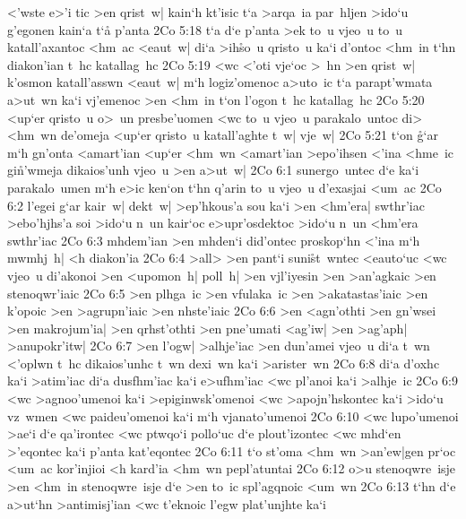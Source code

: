 <'wste
e>'i
tic
>en
qrist~w|
kain`h
kt'isic
t`a
>arqa~ia
par~hljen
>ido`u
g'egonen
kain`a
t`a\r{}
p'anta\bibvsend
\vs 2Co 5:18
t`a
d`e
p'anta
>ek
to~u
vjeo~u
to~u
katall'axantoc
<hm~ac
<eaut~w|
di`a
>ih\r{s}o~u
qristo~u
ka`i
d'ontoc
<hm~in
t`hn
diakon'ian
t~hc
katallag~hc\bibvsend
\vs 2Co 5:19
<wc
<'oti
vje`oc
>~hn
>en
qrist~w|
k'osmon
katall'asswn
<eaut~w|
m`h
logiz'omenoc
a>uto~ic
t`a
parapt'wmata
a>ut~wn
ka`i
vj'emenoc
>en
<hm~in
t`on
l'ogon
t~hc
katallag~hc\bibvsend
\vs 2Co 5:20
<up`er
qristo~u
o>~un
presbe'uomen
<wc
to~u
vjeo~u
parakalo~untoc
di>
<hm~wn
de'omeja
<up`er
qristo~u
katall'aghte
t~w|
vje~w|\bibvsend
\vs 2Co 5:21
t`on
\r{g}`ar
m`h
gn'onta
<amart'ian
<up`er
<hm~wn
<amart'ian
>epo'ihsen
<'ina
<hme~ic
gi\r{n}'wmeja
dikaios'unh
vjeo~u
>en
a>ut~w|\bibvsend
\vs 2Co 6:1
sunergo~untec
d`e
ka`i
parakalo~umen
m`h
e>ic
ken`on
t`hn
q'arin
to~u
vjeo~u
d'exasjai
<um~ac\bibvsend
\vs 2Co 6:2
l'egei
g`ar
kair~w|
dekt~w|
>ep'hkous'a
sou
ka`i
>en
<hm'era|
swthr'iac
>ebo'hjhs'a
soi
>ido`u
n~un
kair`oc
e>upr'osdektoc
>ido`u
n~un
<hm'era
swthr'iac\bibvsend
\vs 2Co 6:3
mhdem'ian
>en
mhden`i
did'ontec
proskop`hn
<'ina
m`h
mwmhj~h|
<h
diakon'ia\bibvsend
\vs 2Co 6:4
>all>
>en
pant`i
suni\r{s}t~wntec
<eauto`uc
<wc
vjeo~u
di'akonoi
>en
<upomon~h|
poll~h|
>en
vjl'iyesin
>en
>an'agkaic
>en
stenoqwr'iaic\bibvsend
\vs 2Co 6:5
>en
plhga~ic
>en
vfulaka~ic
>en
>akatastas'iaic
>en
k'opoic
>en
>agrupn'iaic
>en
nhste'iaic\bibvsend
\vs 2Co 6:6
>en
<agn'othti
>en
gn'wsei
>en
makrojum'ia|
>en
qrhst'othti
>en
pne'umati
<ag'iw|
>en
>ag'aph|
>anupokr'itw|\bibvsend
\vs 2Co 6:7
>en
l'ogw|
>alhje'iac
>en
dun'amei
vjeo~u
di`a
t~wn
<'oplwn
t~hc
dikaios'unhc
t~wn
dexi~wn
ka`i
>arister~wn\bibvsend
\vs 2Co 6:8
di`a
d'oxhc
ka`i
>atim'iac
di`a
dusfhm'iac
ka`i
e>ufhm'iac
<wc
pl'anoi
ka`i
>alhje~ic\bibvsend
\vs 2Co 6:9
<wc
>agnoo'umenoi
ka`i
>epiginwsk'omenoi
<wc
>apojn'hskontec
ka`i
>ido`u
vz~wmen
<wc
paideu'omenoi
ka`i
m`h
vjanato'umenoi\bibvsend
\vs 2Co 6:10
<wc
lupo'umenoi
>ae`i
d`e
qa'irontec
<wc
ptwqo`i
pollo`uc
d`e
plout'izontec
<wc
mhd`en
>'eqontec
ka`i
p'anta
kat'eqontec\bibvsend
\vs 2Co 6:11
t`o
st'oma
<hm~wn
>an'ew|gen
pr`oc
<um~ac
kor'injioi
<h
kard'ia
<hm~wn
pepl'atuntai\bibvsend
\vs 2Co 6:12
o>u
stenoqwre~isje
>en
<hm~in
stenoqwre~isje
d`e
>en
to~ic
spl'agqnoic
<um~wn\bibvsend
\vs 2Co 6:13
t`hn
d`e
a>ut`hn
>antimisj'ian
<wc
t'eknoic
l'egw
plat'unjhte
ka`i
